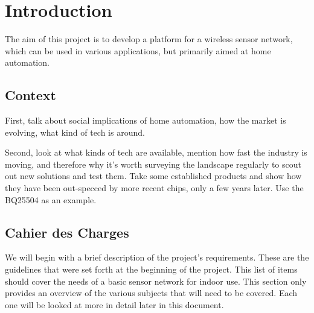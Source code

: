 \chapter{Introduction}\label{ch:introduction}

The aim of this project is to develop a platform for a wireless sensor network,
which can be used in various applications, but primarily aimed at home
automation. 

\section{Context}\label{sec:context}

First, talk about social implications of home automation, how the market is
evolving, what kind of tech is around.

Second, look at what kinds of tech are available, mention how fast the industry
is moving, and therefore why it's worth surveying the landscape regularly to
scout out new solutions and test them. Take some established products and show
how they have been out-specced by more recent chips, only a few years later. Use
the BQ25504 as an example.

\section{Cahier des Charges}\label{sec:cdc}

We will begin with a brief description of the project's requirements. These are
the guidelines that were set forth at the beginning of the project. This list of
items should cover the needs of a basic sensor network for indoor use. This
section only provides an overview of the various subjects that will need to be
covered. Each one will be looked at more in detail later in this document.


